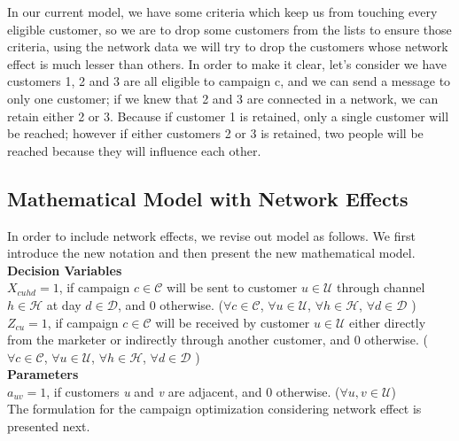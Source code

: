 \documentclass[11pt]{article}
\begin{document}
In our current model, we have some criteria which keep us from touching every eligible customer, so we are to drop some customers from the lists to ensure those criteria, using the network data we will try to drop the customers whose network effect is much lesser than others. In order to make it clear, let's consider we have customers 1, 2 and 3 are all eligible to campaign c, and we can send a message to only one customer; if we knew that 2 and 3 are connected in a network, we can retain either 2 or 3. Because if customer 1 is retained, only a single customer will be reached; however if either customers 2 or 3 is retained, two people will be reached because they will influence each other.

\subsection{Mathematical Model with Network Effects} \label{s:network-modif-model}
In order to include network effects, we revise out model as follows. We first introduce the new notation and then present the new mathematical model.
\\

\noindent \textbf{Decision Variables}\\

\noindent $X_{{c}{u}{h}{d}}=1$, if campaign $c \in \mathcal{C}$ will be sent to customer $u \in \mathcal{U}$ through channel $h \in \mathcal{H}$ at day $d \in \mathcal{D}$, and 0 otherwise.
($\forall c \in \mathcal{C}$, $\forall u \in \mathcal{U}$, $\forall h \in \mathcal{H}$, $\forall d \in \mathcal{D}$ )\\

\noindent $Z_{{c}{u}}=1$, if campaign $c \in \mathcal{C}$ will be received by customer $u \in \mathcal{U}$ either directly from the marketer or indirectly through another customer, and 0 otherwise.
($\forall c \in \mathcal{C}$, $\forall u \in \mathcal{U}$, $\forall h \in \mathcal{H}$, $\forall d \in \mathcal{D}$ )\\

\noindent \textbf{Parameters}\\

\noindent $a_{{u}{v}}=1$, if customers \textit{u} and \textit{v} are adjacent, and 0 otherwise.
($\forall u, v \in \mathcal{U}$)\\


\noindent The formulation for the campaign optimization considering network effect is presented next.
\end{document}
